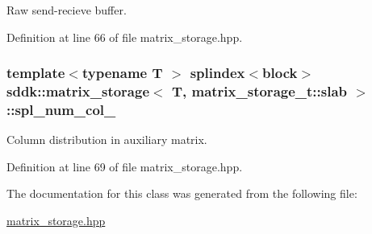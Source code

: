 Raw send-\/recieve buffer. 



Definition at line 66 of file matrix\+\_\+storage.\+hpp.

\hypertarget{classsddk_1_1matrix__storage_3_01_t_00_01matrix__storage__t_1_1slab_01_4_abcb07402371c615777ed73f1d0811e00}{}
\subsubsection[{spl\+\_\+num\+\_\+col\+\_\+}]{\setlength{\rightskip}{0pt plus 5cm}template$<$typename T $>$ {\bf splindex}$<$block$>$ {\bf sddk\+::matrix\+\_\+storage}$<$ T, matrix\+\_\+storage\+\_\+t\+::slab $>$\+::spl\+\_\+num\+\_\+col\+\_\+\hspace{0.3cm}{\ttfamily [private]}}\label{classsddk_1_1matrix__storage_3_01_t_00_01matrix__storage__t_1_1slab_01_4_abcb07402371c615777ed73f1d0811e00}


Column distribution in auxiliary matrix. 



Definition at line 69 of file matrix\+\_\+storage.\+hpp.



The documentation for this class was generated from the following file\+:\begin{DoxyCompactItemize}
\item 
\hyperlink{matrix__storage_8hpp}{matrix\+\_\+storage.\+hpp}\end{DoxyCompactItemize}
